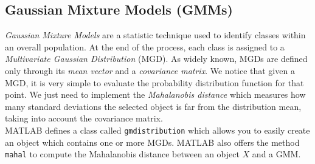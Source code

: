 \subsection{Gaussian Mixture Models (GMMs)}
\label{subsec:gmm}

\textit{Gaussian Mixture Models} are a statistic technique used to identify classes within an overall population. At the end of the process, each class is assigned to a \textit{Multivariate Gaussian Distribution} (MGD).  As widely known, MGDs are defined only through its \textit{mean vector} and a \textit{covariance matrix}. We notice that given a MGD, it is very simple to evaluate the probability distribution function for that point. We just need to implement the \textit{Mahalanobis distance} which measures how many standard deviations the selected object is far from the distribution mean, taking into account the covariance matrix. \\
%
MATLAB defines a class called \texttt{gmdistribution} which allows you to easily create an object which contains one or more MGDs. MATLAB also offers the method \texttt{mahal} to compute the Mahalanobis distance between an object $X$ and a GMM. \\